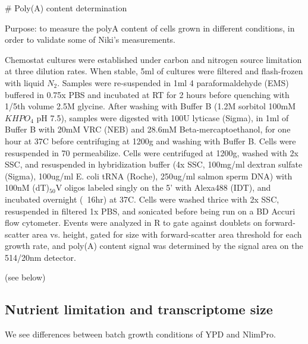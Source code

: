 \# Poly(A) content determination

Purpose: to measure the polyA content of cells grown in different
conditions, in order to validate some of Niki's measurements.

Chemostat cultures were established under carbon and 
nitrogen source limitation at three dilution rates. When stable, 
5ml of cultures were filtered and flash-frozen 
with liquid $N_2$. Samples were re-suspended in 1ml 4%
paraformaldehyde (EMS) buffered in 0.75x PBS and incubated at 
RT for 2 hours before quenching with 1/5th volume 2.5M glycine. 
After washing with Buffer B (1.2M sorbitol 100mM $KHPO_4$ pH 7.5),
samples were digested with 100U lyticase (Sigma), in 1ml of 
Buffer B with 20mM VRC (NEB) and 28.6mM Beta-mercaptoethanol, 
for one hour at 37C before centrifuging at 1200g and washing 
with Buffer B.
Cells were resuspended in 70%
permeabilize. Cells were centrifuged at 1200g, washed with 2x SSC,
and resuspended in hybridization buffer (4x SSC, 
100mg/ml dextran sulfate (Sigma), 100ug/ml E. coli tRNA (Roche), 
250ug/ml salmon sperm DNA) with 100nM (dT)$_{50}$V oligos labeled 
singly on the 5' with Alexa488 (IDT), 
and incubated overnight (~16hr) at 37C.
Cells were washed thrice with 2x SSC, resuspended in filtered 1x PBS,
and sonicated before being run on a BD Accuri flow cytometer.
Events were analyzed in R 
to gate against doublets on forward-scatter area vs. 
height, gated for size with forward-scatter area 
threshold for each growth rate, and
poly(A) content signal was determined by the signal area on the
514/20nm detector.

(see below)


%
%
%
\subsection{Nutrient limitation and transcriptome size}
%
%
%

We see differences between batch growth conditions of YPD and NlimPro.





